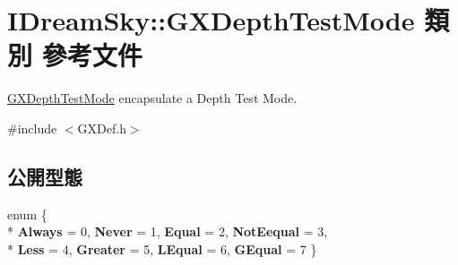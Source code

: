 \hypertarget{class_i_dream_sky_1_1_g_x_depth_test_mode}{}\section{I\+Dream\+Sky\+:\+:G\+X\+Depth\+Test\+Mode 類別 參考文件}
\label{class_i_dream_sky_1_1_g_x_depth_test_mode}


\hyperlink{class_i_dream_sky_1_1_g_x_depth_test_mode}{G\+X\+Depth\+Test\+Mode} encapsulate a Depth Test Mode.  




{\ttfamily \#include $<$G\+X\+Def.\+h$>$}

\subsection*{公開型態}
\begin{DoxyCompactItemize}
\item 
enum \{ \\*
{\bfseries Always} = 0, 
{\bfseries Never} = 1, 
{\bfseries Equal} = 2, 
{\bfseries Not\+Eequal} = 3, 
\\*
{\bfseries Less} = 4, 
{\bfseries Greater} = 5, 
{\bfseries L\+Equal} = 6, 
{\bfseries G\+Equal} = 7
 \}\hypertarget{class_i_dream_sky_1_1_g_x_depth_test_mode_a02bbce2c8275ef13e2f12fbcb6b82993}{}\label{class_i_dream_sky_1_1_g_x_depth_test_mode_a02bbce2c8275ef13e2f12fbcb6b82993}

\end{DoxyCompactItemize}
